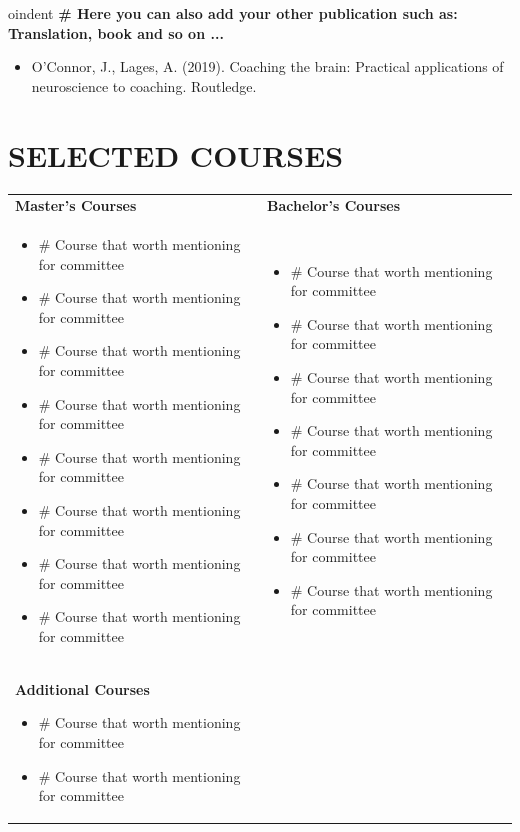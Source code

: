 \documentclass[a4paper,9pt]{extarticle}
\begin{document}
oindent
\textbf{\# Here you can also add your other publication such as: Translation, book and so on ...}
\begin{itemize}
    \item O'Connor, J., Lages, A. (2019). Coaching the brain: Practical applications of neuroscience to coaching. Routledge.
\end{itemize}

\section*{SELECTED COURSES}
    \begin{tabularx}{1\textwidth}{
    >{\raggedright\arraybackslash}X 
   >{\raggedright\arraybackslash}X }
      \textbf{Master's Courses}&   \textbf{Bachelor's Courses}\\ 
     \begin{itemize}
         \item \# Course that worth mentioning for committee
         \item \# Course that worth mentioning for committee
         \item \# Course that worth mentioning for committee
         \item \# Course that worth mentioning for committee
         \item \# Course that worth mentioning for committee
         \item \# Course that worth mentioning for committee
         \item \# Course that worth mentioning for committee
         \item \# Course that worth mentioning for committee
     \end{itemize}
     & \begin{itemize}
         \item \# Course that worth mentioning for committee
         \item \# Course that worth mentioning for committee
         \item \# Course that worth mentioning for committee
         \item \# Course that worth mentioning for committee
         \item \# Course that worth mentioning for committee
         \item \# Course that worth mentioning for committee
         \item \# Course that worth mentioning for committee
              \end{itemize}\\
         \textbf{Additional Courses}
         \begin{itemize}
         \item \# Course that worth mentioning for committee
         \item \# Course that worth mentioning for committee
     \end{itemize}
    \end{tabularx}
\end{document}
